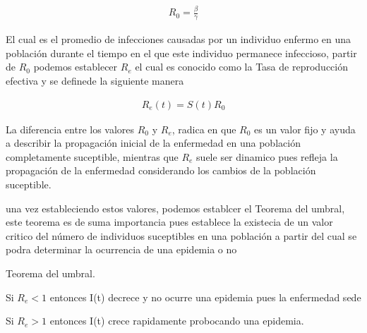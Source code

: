 \begin{align}
R_{0} = \frac{\beta}{\gamma}
\end{align}

El cual es el promedio de infecciones causadas por un individuo enfermo en una población durante el tiempo en el que este individuo permanece infeccioso, partir de $R_{0}$ podemos establecer $R_{e}$ el cual es conocido como la Tasa de reproducción efectiva y se definede la siguiente manera  %

\begin{align}
R_{e} (t) = S(t)R_{0} 
\end{align}

La diferencia entre los valores $R_{0}$ y  $R_{e}$, radica en que $R_{0}$ es un valor fijo y ayuda a describir la propagación inicial de la enfermedad en una población completamente suceptible, mientras que $R_{e}$ suele ser dinamico pues refleja la propagación de la enfermedad considerando los cambios de la población suceptible.  

una vez estableciendo estos valores, podemos establcer el Teorema del umbral, este teorema es de suma importancia pues establece la existecia de un valor critico del número de individuos suceptibles en una población a partir del cual se podra determinar la ocurrencia de una epidemia o no

\begin{teo}
Teorema del umbral.

Si  $R_{e} < 1$ entonces I(t) decrece y no ocurre una epidemia pues la enfermedad sede 

Si  $R_{e} > 1$ entonces I(t) crece rapidamente probocando una epidemia. 
\end{teo}

